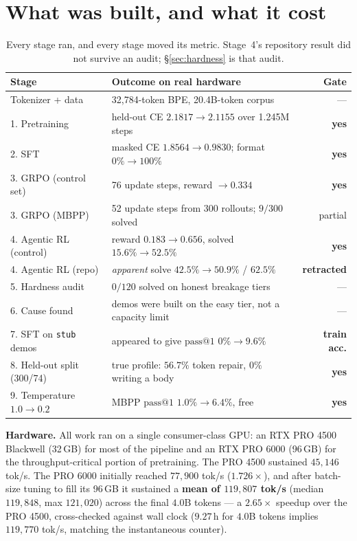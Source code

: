 \documentclass[10pt,a4paper]{article}
\newcommand{\code}[1]{\texttt{\small #1}}
\newcommand{\YES}{\textcolor{good}{\textbf{yes}}}
\begin{document}
\vspace{-0.3cm}
\section{What was built, and what it cost}

\begin{table}[h]
\centering\small
\begin{tabular}{@{}llr@{}}
\toprule
\textbf{Stage} & \textbf{Outcome on real hardware} & \textbf{Gate} \\
\midrule
Tokenizer + data & 32{,}784-token BPE, 20.4B-token corpus & --- \\
1. Pretraining & held-out CE $2.1817 \rightarrow 2.1155$ over 1.245M steps & \YES \\
2. SFT & masked CE $1.8564 \rightarrow 0.9830$; format $0\% \rightarrow 100\%$ & \YES \\
3. GRPO (control set) & 76 update steps, reward $\rightarrow 0.334$ & \YES \\
3. GRPO (MBPP) & 52 update steps from 300 rollouts; $9/300$ solved & partial \\
4. Agentic RL (control) & reward $0.183 \rightarrow 0.656$, solved $15.6\% \rightarrow 52.5\%$ & \YES \\
4. Agentic RL (repo) & \emph{apparent} solve $42.5\% \rightarrow 50.9\%$ / $62.5\%$ & \textbf{\color{acc}retracted} \\
5. Hardness audit & $0/120$ solved on honest breakage tiers & --- \\
6. Cause found & demos were built on the easy tier, not a capacity limit & --- \\
7. SFT on \code{stub} demos & appeared to give $\mathrm{pass@}1$ $0\% \rightarrow 9.6\%$ & \textbf{\color{acc}train acc.} \\
8. Held-out split (300/74) & true profile: $56.7\%$ token repair, $0\%$ writing a body & \YES \\
9. Temperature $1.0 \rightarrow 0.2$ & MBPP $\mathrm{pass@}1$ $1.0\% \rightarrow 6.4\%$, free & \YES \\
\bottomrule
\end{tabular}
\caption{Every stage ran, and every stage moved its metric. Stage~4's repository
result did not survive an audit; \S\ref{sec:hardness} is that audit.}
\end{table}

\noindent\textbf{Hardware.} All work ran on a single consumer-class GPU: an
RTX PRO 4500 Blackwell (32\,GB) for most of the pipeline and an RTX PRO 6000
(96\,GB) for the throughput-critical portion of pretraining. The PRO 4500
sustained $45{,}146$ tok/s. The PRO 6000 initially reached $77{,}900$ tok/s
($1.726\times$), and after batch-size tuning to fill its 96\,GB it sustained a
\textbf{mean of $119{,}807$ tok/s} (median $119{,}848$, max $121{,}020$) across
the final $4.0$B tokens --- a $2.65\times$ speedup over the PRO 4500,
cross-checked against wall clock ($9.27$\,h for $4.0$B tokens implies
$119{,}770$ tok/s, matching the instantaneous counter).
\end{document}
